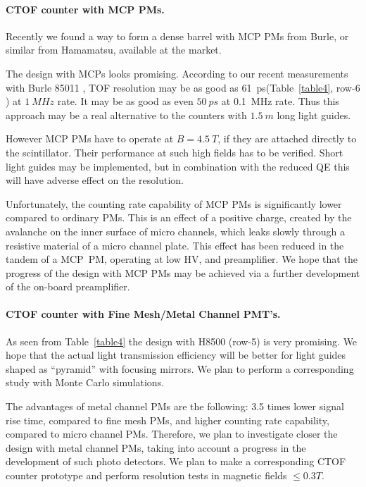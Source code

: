 \paragraph{CTOF counter with MCP PMs.}
Recently we found a way to form a dense barrel with  MCP PMs from Burle, 
or similar from Hamamatsu, available at the market.

The design with MCPs looks promising. According to our recent measurements  with Burle 85011 , 
TOF resolution may be as good as 61~ps(Table~\ref{table4}, row-6 )
at $1~MHz$ rate. It may be as good as even $50~ps$ at 0.1~MHz rate.
Thus this approach may be a real alternative to the counters with $1.5~m$ long light guides.

However MCP PMs have to operate at $B=4.5~T$, if they are attached directly to the scintillator.
Their performance at such high fields has to be verified. 
Short light guides may be implemented, but in combination 
with the reduced QE this will  have adverse effect on the resolution. 

Unfortunately, the counting rate capability of MCP PMs is significantly lower 
compared to ordinary PMs. This is an effect of  
a positive charge,   created by the  avalanche 
on the inner surface of  micro channels, which  leaks slowly 
 through a resistive material of a micro channel plate.
 This effect has been reduced in the  tandem of a MCP~PM, operating at low HV, and preamplifier\cite{}.
We hope that  the  progress of the  design with MCP PMs may be achieved via 
 a further development of the on-board preamplifier.   

\paragraph{CTOF counter with Fine Mesh/Metal Channel PMT's.}
As seen  from Table~\ref{table4} the design with H8500 (row-5)
is very promising.   We hope   that the actual light transmission 
efficiency will  be better  for light guides shaped as ``pyramid'' 
with focusing mirrors. We plan to perform a corresponding  
study with Monte Carlo simulations.

The  advantages of   metal channel PMs are the following:  
 3.5 times lower signal 
 rise time, compared to fine mesh PMs,  
 and higher counting rate capability, compared to  micro channel PMs.
Therefore, we plan  to investigate closer the design with
metal channel PMs, taking into account a progress in the development of such photo detectors.
  We plan to make a corresponding  CTOF counter prototype  and perform  resolution tests in magnetic fields $\leq0.3T$.

